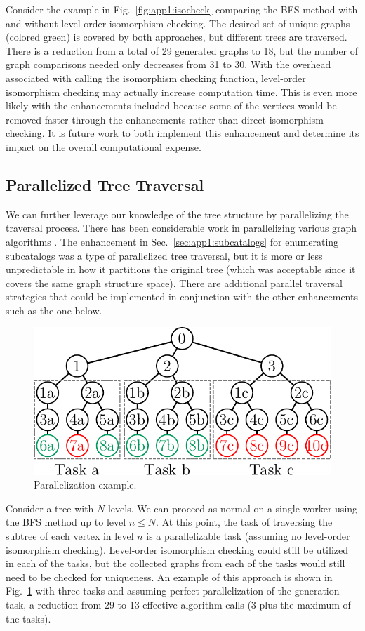 Consider the example in Fig.~\ref{fig:app1:isocheck} comparing the BFS method with and without level-order isomorphism checking.
The desired set of unique graphs (colored green) is covered by both approaches, but different trees are traversed. 
There is a reduction from a total of 29 generated graphs to 18, but the number of graph comparisons needed only decreases from 31 to 30.
With the overhead associated with calling the isomorphism checking function, level-order isomorphism checking may actually increase computation time.
This is even more likely with the enhancements included because some of the vertices would be removed faster through the enhancements rather than direct isomorphism checking.
It is future work to both implement this enhancement and determine its impact on the overall computational expense.

\subsection{Parallelized Tree Traversal}

We can further leverage our knowledge of the tree structure by parallelizing the traversal process. 
There has been considerable work in parallelizing various graph algorithms \cite{Quinn1984a, Reghbati1978a}.
The enhancement in Sec.~\ref{sec:app1:subcatalogs} for enumerating subcatalogs was a type of parallelized tree traversal, but it is more or less unpredictable in how it partitions the original tree (which was acceptable since it covers the same graph structure space).
There are additional parallel traversal strategies that could be implemented in conjunction with the other enhancements such as the one below.

\begin{figure}[h!]
\centering
\includegraphics[scale=0.6]{../app1/fig/parallel}
\caption{Parallelization example.\label{fig:app1:parallel}}
\end{figure}

Consider a tree with $N$ levels.
We can proceed as normal on a single worker using the BFS method up to level $n\leq N$.
At this point, the task of traversing the subtree of each vertex in level $n$ is a parallelizable task (assuming no level-order isomorphism checking).
Level-order isomorphism checking could still be utilized in each of the tasks, but the collected graphs from each of the tasks would still need to be checked for uniqueness.
An example of this approach is shown in Fig.~\ref{fig:app1:parallel} with three tasks and assuming perfect parallelization of the generation task, a reduction from 29 to 13 effective algorithm calls (3 plus the maximum of the tasks).